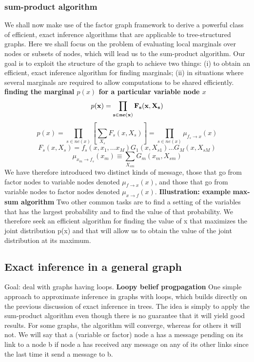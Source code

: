 \documentclass[a4paper]{book}
\begin{document}
\subsubsection{sum-product algorithm}
We shall now make use of the factor graph framework to derive a powerful class
of efficient, exact inference algorithms that are applicable to tree-structured graphs.
Here we shall focus on the problem of evaluating local marginals over nodes or
subsets of nodes, which will lead us to the sum-product algorithm.\newline
Our goal is to exploit the structure of
the graph to achieve two things: (i) to obtain an efficient, exact inference algorithm
for finding marginals; (ii) in situations where several marginals are required to allow
computations to be shared efficiently.
\textbf{finding the marginal $p(x)$ for a particular variable node $x$}\newline
$$p(\bf x) = \prod_{s\in ne(x)}F_s(x,X_s)   $$
$$p(x) = \prod_{s\in ne(x)}[\sum_{X_s}F_s(x,X_s)] = \prod_{s\in ne(x)}\mu_{f_s\rightarrow x}(x) $$
$$F_s(x,X_s) =  f_s(x,x_1,...x_M)G_1(x,X_{s1})...G_M(x,X_{sM})$$
$$\mu_{x_m\rightarrow f_s}(x_m) \equiv \sum_{X_{sm}}G_m(x_m,X_{sm})$$
We have therefore introduced two distinct kinds of message, those that go from factor
nodes to variable nodes denoted $\mu_{f\rightarrow x}(x)$, and those that go from variable nodes to
factor nodes denoted $\mu_{x\rightarrow f}(x).$
\textbf{Illustration: example}
\textbf{max-sum algorithm}
Two other common tasks are to find a setting of the variables that has the largest probability
and to find the value of that probability. We therefore seek an efficient algorithm for finding the value of x that maximizes
the joint distribution p(x) and that will allow us to obtain the value of the
joint distribution at its maximum.
\subsection{Exact inference in a general graph}
Goal: deal with graphs having loops.\newline
\textbf{Loopy belief progpagation}
One simple approach to approximate inference in graphs with
loops, which builds directly on the previous discussion of exact inference in trees.
The idea is simply to apply the sum-product algorithm even though there is no guarantee
that it will yield good results. For some graphs, the algorithm will converge, whereas for others it will not. \newline
We will say that a (variable or factor) node a has a message pending on its link to a node b if node a has received any
message on any of its other links since the last time it send a message to b.
\end{document}
